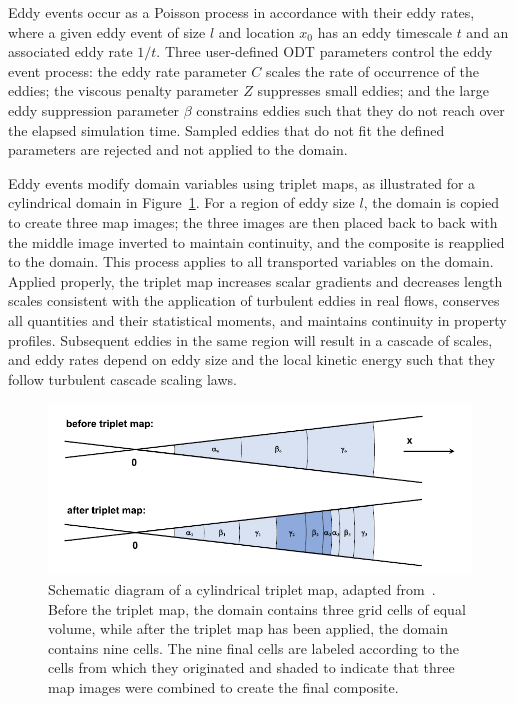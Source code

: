 \documentclass[preprint,12pt, a4paper]{elsarticle}
\begin{document}
Eddy events occur as a Poisson process in accordance with their eddy rates, where a given eddy event of size $l$ and location $x_0$ has an eddy timescale $t$ and an associated eddy rate $1/t$. Three user-defined ODT parameters control the eddy event process: the eddy rate parameter $C$ scales the rate of occurrence of the eddies; the viscous penalty parameter $Z$ suppresses small eddies; and the large eddy suppression parameter $\beta$ constrains eddies such that they do not reach over the elapsed simulation time. Sampled eddies that do not fit the defined parameters are rejected and not applied to the domain.

Eddy events modify domain variables using triplet maps, as illustrated for a cylindrical domain in Figure~\ref{fig:tripletmap}. For a region of eddy size $l$, the domain is copied to create three map images; the three images are then placed back to back with the middle image inverted to maintain continuity, and the composite is reapplied to the domain. This process applies to all transported variables on the domain. Applied properly, the triplet map increases scalar gradients and decreases length scales consistent with the application of turbulent eddies in real flows, conserves all quantities and their statistical moments, and maintains continuity in property profiles. Subsequent eddies in the same region will result in a cascade of scales, and eddy rates depend on eddy size and the local kinetic energy such that they follow turbulent cascade scaling laws.  

\begin{figure}
	\centering
	\includegraphics[width=\textwidth]{../figures/tripletmap/tripletmap.png} 
	\caption{Schematic diagram of a cylindrical triplet map, adapted from~\cite{Lignell_2018}. Before the triplet map, the domain contains three grid cells of equal volume, while after the triplet map has been applied, the domain contains nine cells. The nine final cells are labeled according to the cells from which they originated and shaded to indicate that three map images were combined to create the final composite.}
	\label{fig:tripletmap}
\end{figure}
\end{document}

